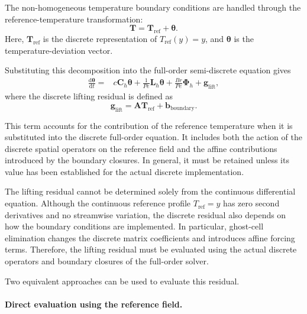 The non-homogeneous temperature boundary conditions are
handled through the reference-temperature transformation:
\begin{equation}
    \boxed{
    \mathbf{T}
    =
    \mathbf{T}_{\mathrm{ref}}+\boldsymbol{\theta}.
    }
    \label{eq:discrete_lifting}
\end{equation}
Here, $\mathbf{T}_{\mathrm{ref}}$ is the discrete representation
of $T_{\mathrm{ref}}(y)=y$, and $\boldsymbol{\theta}$ is the
temperature-deviation vector.

Substituting this decomposition into the full-order
semi-discrete equation gives
\begin{align}
    \frac{\mathrm{d}\boldsymbol{\theta}}{\mathrm{d}t}
    ={}&
    c\mathbf{C}_h\boldsymbol{\theta}
    +\frac{1}{Pe}\mathbf{L}_h\boldsymbol{\theta}
    +\frac{Br}{Pe}\boldsymbol{\Phi}_h
    +\mathbf{g}_{\mathrm{lift}},
    \label{eq:lifted_discrete_equation}
\end{align}
where the discrete lifting residual is defined as
\begin{equation}
    \boxed{
    \mathbf{g}_{\mathrm{lift}}
    =
    \mathbf{A}\mathbf{T}_{\mathrm{ref}}
    +\mathbf{b}_{\mathrm{boundary}}.
    }
    \label{eq:discrete_lifting_residual}
\end{equation}

This term accounts for the contribution of the reference
temperature when it is substituted into the discrete
full-order equation. It includes both the action of the
discrete spatial operators on the reference field and the
affine contributions introduced by the boundary closures.
In general, it must be retained unless its value has been
established for the actual discrete implementation.

The lifting residual cannot be determined solely from the
continuous differential equation. Although the continuous
reference profile $T_{\mathrm{ref}}=y$ has zero second
derivatives and no streamwise variation, the discrete
residual also depends on how the boundary conditions are
implemented. In particular, ghost-cell elimination changes
the discrete matrix coefficients and introduces affine
forcing terms. Therefore, the lifting residual must be
evaluated using the actual discrete operators and boundary
closures of the full-order solver.

Two equivalent approaches can be used to evaluate this
residual.

\paragraph{Direct evaluation using the reference field.}

